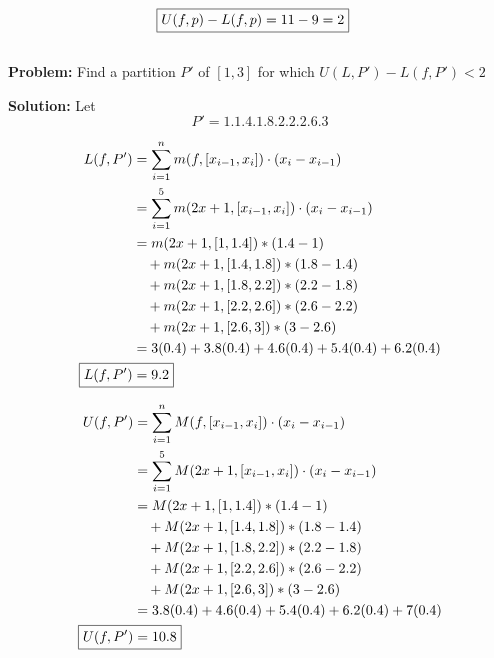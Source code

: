 \documentclass[]{article}
\begin{document}
\begin{align*}
    \Aboxed{U(f,p) - L(f,p) &= 11 - 9 = 2}
\end{align*}

\newpage
\subsection{}
\textbf{Problem:}
Find a partition $P'$ of $[1,3]$ for which $U(L,P') - L(f,P') < 2$

\textbf{Solution:}
Let \[
    P' = \qty{1, 1.4, 1.8, 2.2, 2.6, 3}
\]

\begin{align*}
    L(f,P') &= \sum_{i=1}^{n} m(f,[x_{i-1},x_i]) \cdot (x_i - x_{i-1})\\
        &= \sum_{i=1}^{5} m(2 x + 1,[x_{i-1},x_i]) \cdot (x_i - x_{i-1})\\
        &= m(2x + 1, [1, 1.4]) * (1.4 - 1)\\
            &\quad  + m(2x  + 1, [1.4, 1.8]) * (1.8 - 1.4)\\
            &\quad  + m(2x + 1, [1.8, 2.2]) * (2.2 - 1.8)\\
            &\quad  + m(2x + 1, [2.2, 2.6]) * (2.6 - 2.2)\\
            &\quad  + m(2x + 1, [2.6, 3]) * (3 - 2.6)\\
        &= 3 (0.4) 
            + 3.8 (0.4)
            + 4.6 (0.4)
            + 5.4 (0.4)
            + 6.2 (0.4)\\
    \Aboxed{L(f,P') &= 9.2}
\end{align*}

\begin{align*}
    U(f,P') &= \sum_{i=1}^{n} M(f,[x_{i-1},x_i]) \cdot (x_i - x_{i-1})\\
        &= \sum_{i=1}^{5} M(2 x + 1,[x_{i-1},x_i]) \cdot (x_i - x_{i-1})\\
        &= M(2x + 1, [1, 1.4]) * (1.4 - 1)\\
            &\quad  + M(2x  + 1, [1.4, 1.8]) * (1.8 - 1.4)\\
            &\quad  + M(2x + 1, [1.8, 2.2]) * (2.2 - 1.8)\\
            &\quad  + M(2x + 1, [2.2, 2.6]) * (2.6 - 2.2)\\
            &\quad  + M(2x + 1, [2.6, 3]) * (3 - 2.6)\\
        &= 3.8 (0.4) 
            + 4.6 (0.4)
            + 5.4 (0.4)
            + 6.2 (0.4)
            + 7 (0.4)\\
    \Aboxed{U(f,P') &= 10.8}
\end{align*}
\end{document}
